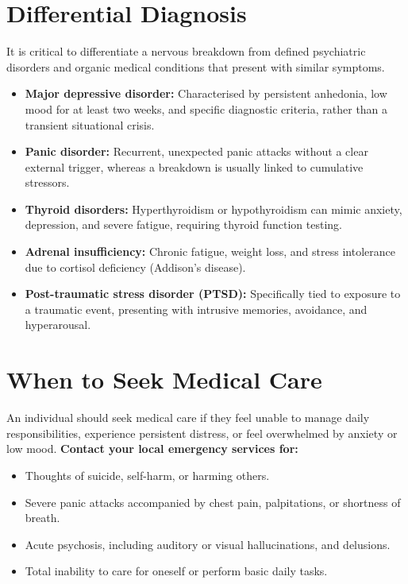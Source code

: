 \section*{Differential Diagnosis}
It is critical to differentiate a nervous breakdown from defined psychiatric disorders and organic medical conditions that present with similar symptoms.
\begin{itemize}
    \item \textbf{Major depressive disorder:} Characterised by persistent anhedonia, low mood for at least two weeks, and specific diagnostic criteria, rather than a transient situational crisis.
    \item \textbf{Panic disorder:} Recurrent, unexpected panic attacks without a clear external trigger, whereas a breakdown is usually linked to cumulative stressors.
    \item \textbf{Thyroid disorders:} Hyperthyroidism or hypothyroidism can mimic anxiety, depression, and severe fatigue, requiring thyroid function testing.
    \item \textbf{Adrenal insufficiency:} Chronic fatigue, weight loss, and stress intolerance due to cortisol deficiency (Addison's disease).
    \item \textbf{Post-traumatic stress disorder (PTSD):} Specifically tied to exposure to a traumatic event, presenting with intrusive memories, avoidance, and hyperarousal.
\end{itemize}

\section*{When to Seek Medical Care}
An individual should seek medical care if they feel unable to manage daily responsibilities, experience persistent distress, or feel overwhelmed by anxiety or low mood.
\hfill \break
\textbf{Contact your local emergency services for:}
\begin{itemize}
    \item Thoughts of suicide, self-harm, or harming others.
    \item Severe panic attacks accompanied by chest pain, palpitations, or shortness of breath.
    \item Acute psychosis, including auditory or visual hallucinations, and delusions.
    \item Total inability to care for oneself or perform basic daily tasks.
\end{itemize}

